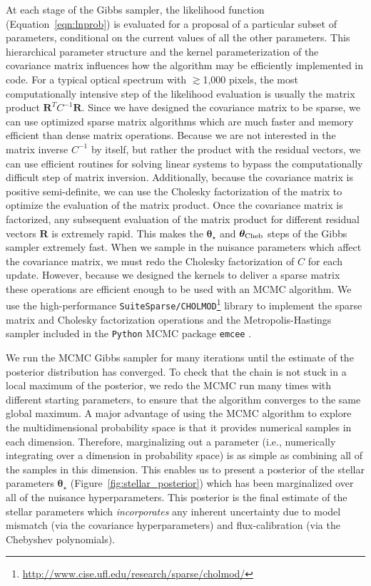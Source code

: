 \documentclass[preprint]{aastex} %
\newcommand{\vt}{ {\bm \theta}}
\newcommand{\vtstar}{\vt_{\star}}
\newcommand{\vtcheb}{\vt_{\rm Cheb}}
\newcommand{\fR}{ {\bm R}}
\begin{document}
At each stage of the Gibbs sampler, the likelihood function (Equation~\ref{eqn:lnprob}) is evaluated for a proposal of a particular subset of parameters, conditional on the current values of all the other parameters. This hierarchical parameter structure and the kernel parameterization of the covariance matrix influences how the algorithm may be efficiently implemented in code. For a typical optical spectrum with $\gtrsim$1,000 pixels, the most computationally intensive step of the likelihood evaluation is usually the matrix product $\fR^T C^{-1} \fR$. Since we have designed the covariance matrix to be sparse, we can use optimized sparse matrix algorithms which are much faster and memory efficient than dense matrix operations. Because we are not interested in the matrix inverse $C^{-1}$ by itself, but rather the product with the residual vectors, we can use efficient routines for solving linear systems to bypass the computationally difficult step of matrix inversion. Additionally, because the covariance matrix is positive semi-definite, we can use the Cholesky factorization of the matrix to optimize the evaluation of the matrix product. Once the covariance matrix is factorized, any subsequent evaluation of the matrix product for different residual vectors $\fR$ is extremely rapid. This makes the $\vtstar$ and $\vtcheb$ steps of the Gibbs sampler extremely fast.
When we sample in the nuisance parameters which affect the covariance matrix, we must redo the Cholesky factorization of $C$ for each update. However, because we designed the kernels to deliver a sparse matrix these operations are efficient enough to be used with an MCMC algorithm.  We use the high-performance \texttt{SuiteSparse/CHOLMOD}\footnote{\url{http://www.cise.ufl.edu/research/sparse/cholmod/}} library to implement the sparse matrix and Cholesky factorization operations \citep{cdh+08, dh09} and the Metropolis-Hastings sampler included in the \texttt{Python} MCMC package \texttt{emcee} \citep{fhl+12}.

We run the MCMC Gibbs sampler for many iterations until the estimate of the posterior distribution has converged. To check that the chain is not stuck in a local maximum of the posterior, we redo the MCMC run many times with different starting parameters, to ensure that the algorithm converges to the same global maximum. A major advantage of using the MCMC algorithm to explore the multidimensional probability space is that it provides numerical samples in each dimension. Therefore, marginalizing out a parameter (i.e., numerically integrating over a dimension in probability space) is as simple as combining all of the samples in this dimension. This enables us to present a posterior of the stellar parameters $\vtstar$ (Figure~\ref{fig:stellar_posterior}) which has been marginalized over all of the nuisance hyperparameters. This posterior is the final estimate of the stellar parameters which \emph{incorporates} any inherent uncertainty due to model mismatch (via the covariance hyperparameters) and flux-calibration (via the Chebyshev polynomials).
\end{document}
